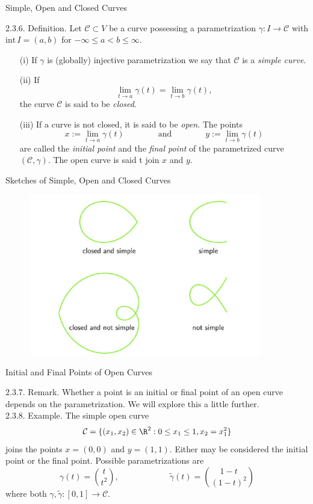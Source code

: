 \documentclass[smaller,hyperref={CJKbookmarks=true}]{beamer}
\begin{document}
\begin{frame}[t]{Simple, Open and Closed Curves}
\begin{spacing}{1}
\alert{2.3.6. Definition.} Let $\mathcal{C}\subset V$ be a curve possessing a parametrization $\gamma:I\to\mathcal{C}$ with $\text{int}\,I=(a,b)$ for $-\infty\leq a<b\leq\infty$.
\begin{itemize}
  \item[(i)] If $\gamma$ is (globally) injective parametrization we say that $\mathcal{C}$ is a \emph{simple curve}.
  \item[(ii)] If
  \[\lim_{t\to a}\gamma(t)=\lim_{t\to b}\gamma(t),\]
  the curve $\mathcal{C}$ is said to be \emph{closed}.
  \item[(iii)] If a curve is not closed, it is said to be \emph{open}. The points
      \[x:=\lim_{t\to a}\gamma(t)\qquad\qquad\text{and}\qquad\qquad y:=\lim_{t\to b}\gamma(t)\]
      are called the \emph{initial point} and the \emph{final point} of the parametrized curve $(\mathcal{C},\gamma)$. The open curve is said t join $x$ and $y$.
\end{itemize}
\end{spacing}
\end{frame}
\begin{frame}[t]{Sketches of Simple, Open and Closed Curves}
\vspace*{-20pt}
\begin{figure}
  \centering
  \includegraphics[width=\textwidth,height=200pt]{curves.jpg}

\end{figure}
\end{frame}
\begin{frame}[c]{Initial and Final Points of Open Curves}
\begin{spacing}{1}
\alert{2.3.7. Remark.} Whether a point is an initial or final point of an open curve
depends on the parametrization. We will explore this a little further.\\[5pt]
\alert{2.3.8. Example.} The simple open curve
\[\mathcal{C}=\{(x_1,x_2)\in\R^2:0\leq x_1\leq 1,x_2=x_1^2\}\]
joins the points $x=(0,0)$ and $y=(1,1)$. Either may be considered the initial point or the final point. Possible parametrizations are
\[\gamma(t)=\binom{t}{t^2},\qquad\qquad\qquad\widetilde{\gamma}
(t)=\binom{1-t}{(1-t)^2}\]
where both $\gamma,\widetilde{\gamma}:[0,1]\to \mathcal{C}.$
\end{spacing}
\end{frame}
\end{document}
